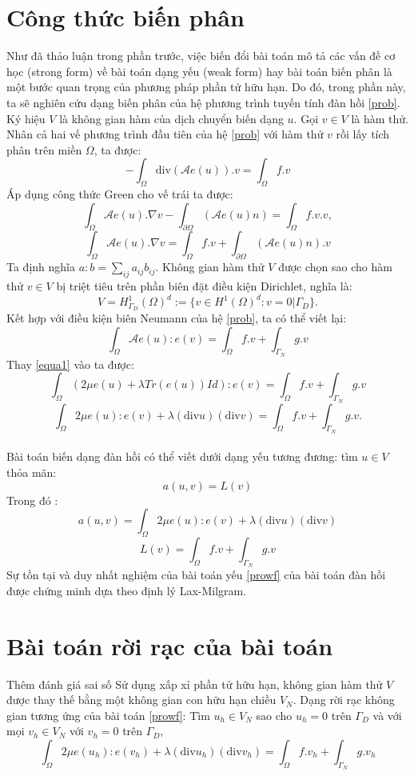 \documentclass[
12pt, %
oneside, %
english, %
onehalfspacing, %
nolistspacing, %
headsepline, %
addchap,
]{MastersDoctoralThesis} %
\begin{document}
\section{Công thức biến phân}\label{sec:chap1_characteristicMethod}
Như đã thảo luận trong phần trước, việc biến đổi bài toán mô tả các vấn đề cơ học (strong form) về bài toán dạng yếu (weak form) hay bài toán biến phân là một bước quan trọng của phương pháp phần tử hữu hạn. Do đó, trong phần này, ta sẽ nghiên cứu dạng biến phân của hệ phương trình tuyến tính đàn hồi \eqref{prob}.\\

Ký hiệu $V$ là không gian hàm của dịch chuyển biến dạng $u$. Gọi $v \in V$ là hàm thử. Nhân cả hai vế phương trình đầu tiên của hệ \eqref{prob} với hàm thử $v$ rồi lấy tích phân trên miền $\Omega$, ta được:
$$-\int_\Omega\text{div}(\mathcal{A}e(u)).v = \int_\Omega f.v$$
Áp dụng công thức Green cho vế trái ta được:
$$\int_\Omega\mathcal{A}e(u).\nabla v - \int_{\partial \Omega}(\mathcal{A}e(u)n) = \int_\Omega f.v.v,$$
$$\int_\Omega\mathcal{A}e(u).\nabla v = \int_\Omega f.v + \int_{\partial \Omega}(\mathcal{A}e(u)n).v$$
Ta định nghĩa $a : b = \sum_{ij}{a_{ij}b_{ij}}.$ Không gian hàm thử $V$ được chọn sao cho hàm thử $v \in V$ bị triệt tiêu trên phần biên đặt điều kiện Dirichlet, nghĩa là:
$$V = H^1_{\Gamma_D}(\Omega)^d := \{v \in H^1(\Omega)^d : v = 0|\Gamma_D\}.$$
Kết hợp với điều kiện biên Neumann của hệ \eqref{prob}, ta có thể viết lại:
$$\int_\Omega\mathcal{A}e(u):e(v) = \int_\Omega f.v + \int_{\Gamma_N}g.v$$
Thay \eqref{equa1} vào ta được:
$$\int_\Omega(2\mu e(u) + \lambda Tr(e(u))Id):e(v) = \int_\Omega f.v + \int_{\Gamma_N}g.v$$
$$\int_\Omega 2\mu e(u) : e(v) + \lambda(\text{div}u)(\text{div}v) = \int_\Omega f.v + \int_{\Gamma_N}g.v.$$\\
Bài toán biến dạng đàn hồi có thể viết dưới dạng yếu tương đương: tìm $u\in V$ thỏa mãn:
\begin{equation}\label{prowf}
a(u,v) = L(v)
\end{equation}
Trong đó :
$$a(u,v) = \int_\Omega 2\mu e(u) : e(v) + \lambda(\text{div}u)(\text{div}v)$$
$$L(v) = \int_\Omega f.v + \int_{\Gamma_N}g.v$$
Sự tồn tại và duy nhất nghiệm của bài toán yếu \ref{prowf} của bài toán đàn hồi được chứng minh dựa theo định lý Lax-Milgram.
\section{Bài toán rời rạc của bài toán}
Thêm đánh giá sai số
Sử dụng xấp xỉ phần tử hữu hạn, không gian hàm thử $V$ được thay thế bằng một không gian con hữu hạn chiều $V_N$. Dạng rời rạc không gian tương ứng của bài toán \ref{prowf}: Tìm $u_h \in V_N$
sao cho $u_h = 0$ trên $\Gamma_D$ và với mọi $v_h \in V_N$ với $v_h = 0$ trên $\Gamma_D$,
\begin{equation}\label{prod}
\int_\Omega 2\mu e(u_h) : e(v_h) + \lambda(\text{div}u_h)(\text{div}v_h) = \int_\Omega f.v_h + \int_{\Gamma_N}g.v_h
\end{equation}
\end{document}
